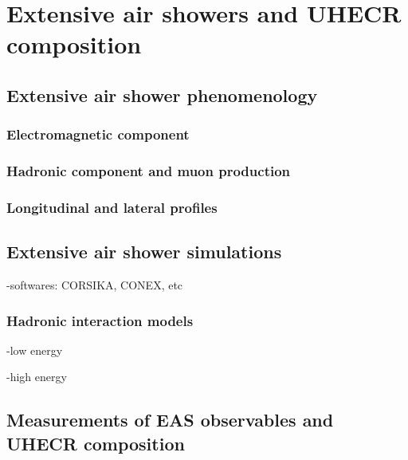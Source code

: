 \chapter[Extensive air showers and UHECR composition]{Extensive air showers and UHECR composition}
\label{sec:showers}



\section{Extensive air shower phenomenology}
\label{sec:showers:phen}

\subsection{Electromagnetic component}
\label{sec:showers:phen:em}

\subsection{Hadronic component and muon production}
\label{sec:showers:phen:had}

\subsection{Longitudinal and lateral profiles}
\label{sec:showers:phen:prof}


\section{Extensive air shower simulations}


-softwares: CORSIKA, CONEX, etc

\subsection{Hadronic interaction models}

-low energy

-high energy

\section{Measurements of EAS observables and UHECR composition}

